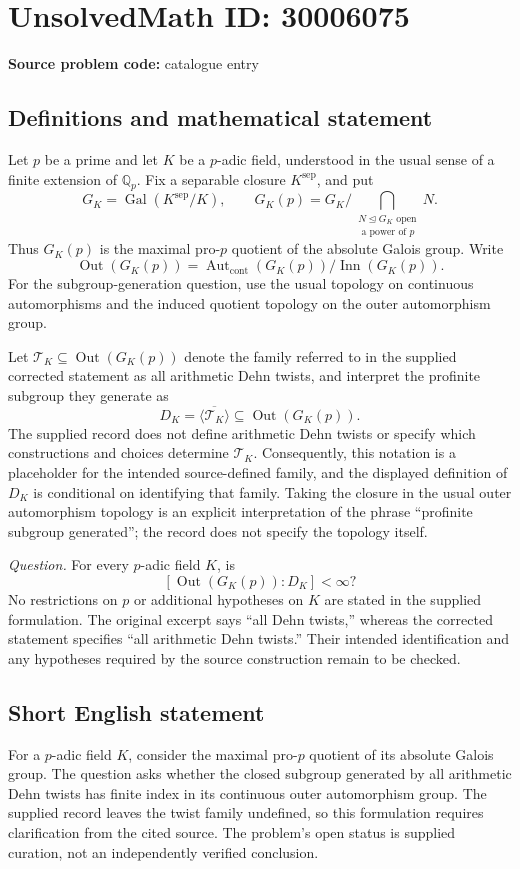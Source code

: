 \documentclass[11pt]{article}
\newcommand{\Q}{\mathbb{Q}}
\begin{document}
\section*{UnsolvedMath ID: 30006075}
\textbf{Source problem code:} catalogue entry
\subsection{Definitions and mathematical statement}
Let \(p\) be a prime and let \(K\) be a \(p\)-adic field, understood in the usual sense of a finite extension of \(\Q_p\). Fix a separable closure \(K^{\mathrm{sep}}\), and put
\[
G_K=\operatorname{Gal}(K^{\mathrm{sep}}/K),\qquad
G_K(p)=G_K\Big/\bigcap_{\substack{N\trianglelefteq G_K\text{ open}\\[G_K:N]\text{ a power of }p}}N.
\]
Thus \(G_K(p)\) is the maximal pro-\(p\) quotient of the absolute Galois group. Write
\[
\operatorname{Out}(G_K(p))=
\operatorname{Aut}_{\mathrm{cont}}(G_K(p))/\operatorname{Inn}(G_K(p)).
\]
For the subgroup-generation question, use the usual topology on continuous automorphisms and the induced quotient topology on the outer automorphism group.

Let \(\mathcal T_K\subseteq\operatorname{Out}(G_K(p))\) denote the family referred to in the supplied corrected statement as all arithmetic Dehn twists, and interpret the profinite subgroup they generate as
\[
D_K=\overline{\langle\mathcal T_K\rangle}
\subseteq\operatorname{Out}(G_K(p)).
\]
The supplied record does not define arithmetic Dehn twists or specify which constructions and choices determine \(\mathcal T_K\). Consequently, this notation is a placeholder for the intended source-defined family, and the displayed definition of \(D_K\) is conditional on identifying that family. Taking the closure in the usual outer automorphism topology is an explicit interpretation of the phrase ``profinite subgroup generated''; the record does not specify the topology itself.

\emph{Question.} For every \(p\)-adic field \(K\), is
\[
[\operatorname{Out}(G_K(p)):D_K]<\infty?
\]
No restrictions on \(p\) or additional hypotheses on \(K\) are stated in the supplied formulation. The original excerpt says ``all Dehn twists,'' whereas the corrected statement specifies ``all arithmetic Dehn twists.'' Their intended identification and any hypotheses required by the source construction remain to be checked.
\subsection{Short English statement}
For a \(p\)-adic field \(K\), consider the maximal pro-\(p\) quotient of its absolute Galois group. The question asks whether the closed subgroup generated by all arithmetic Dehn twists has finite index in its continuous outer automorphism group. The supplied record leaves the twist family undefined, so this formulation requires clarification from the cited source. The problem's open status is supplied curation, not an independently verified conclusion.
\end{document}
